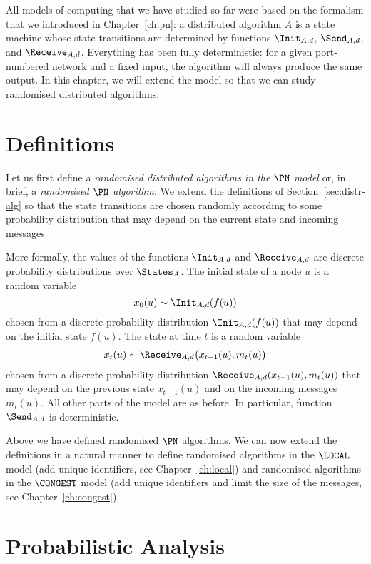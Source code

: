 
All models of computing that we have studied so far were based on the formalism that we introduced in Chapter~\ref{ch:pn}: a distributed algorithm $A$ is a state machine whose state transitions are determined by functions $\Init_{A,d}$, $\Send_{A,d}$, and $\Receive_{A,d}$. Everything has been fully deterministic: for a given port-numbered network and a fixed input, the algorithm will always produce the same output. In this chapter, we will extend the model so that we can study randomised distributed algorithms.


\section{Definitions}\label{sec:randomised}

Let us first define a \emph{randomised distributed algorithms in the $\PN$ model} or, in brief, a \emph{randomised $\PN$ algorithm}. We extend the definitions of Section~\ref{sec:distr-alg} so that the state transitions are chosen randomly according to some probability distribution that may depend on the current state and incoming messages.

More formally, the values of the functions $\Init_{A,d}$ and $\Receive_{A,d}$ are discrete probability distributions over $\States_A$. The initial state of a node $u$ is a random variable
\[
    x_0(u) \sim \Init_{A,d}(f(u))
\]
chosen from a discrete probability distribution $\Init_{A,d}(f(u))$ that may depend on the initial state $f(u)$. The state at time $t$ is a random variable
\[
    x_t(u) \sim \Receive_{A,d}\bigl(x_{t-1}(u), m_t(u) \bigr)
\]
chosen from a discrete probability distribution $\Receive_{A,d}(x_{t-1}(u), m_t(u))$ that may depend on the previous state $x_{t-1}(u)$ and on the incoming messages $m_t(u)$. All other parts of the model are as before. In particular, function $\Send_{A,d}$ is deterministic.

Above we have defined randomised $\PN$ algorithms. We can now extend the definitions in a natural manner to define randomised algorithms in the $\LOCAL$ model (add unique identifiers, see Chapter~\ref{ch:local}) and randomised algorithms in the $\CONGEST$ model (add unique identifiers and limit the size of the messages, see Chapter~\ref{ch:congest}).


\section{Probabilistic Analysis}

